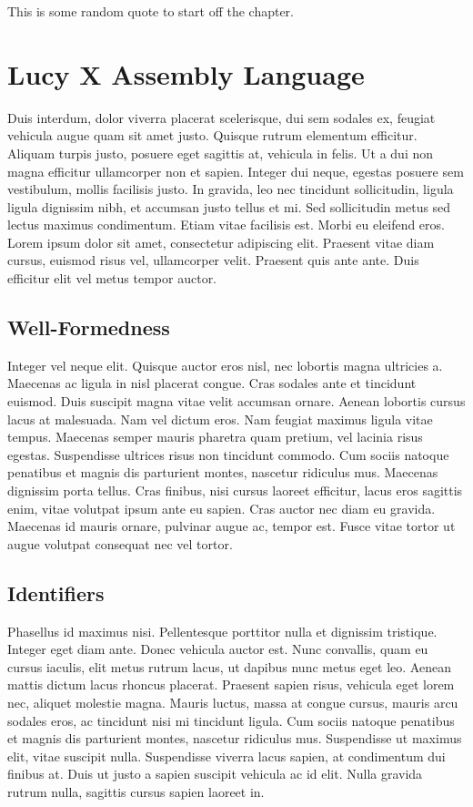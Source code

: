 \begin{savequote}[75mm]
This is some random quote to start off the chapter.
\end{savequote}

\chapter{Lucy X Assembly Language}
Duis interdum, dolor viverra placerat scelerisque, dui sem sodales ex, feugiat vehicula augue quam sit amet justo. Quisque rutrum elementum efficitur. Aliquam turpis justo, posuere eget sagittis at, vehicula in felis. Ut a dui non magna efficitur ullamcorper non et sapien. Integer dui neque, egestas posuere sem vestibulum, mollis facilisis justo. In gravida, leo nec tincidunt sollicitudin, ligula ligula dignissim nibh, et accumsan justo tellus et mi. Sed sollicitudin metus sed lectus maximus condimentum. Etiam vitae facilisis est. Morbi eu eleifend eros. Lorem ipsum dolor sit amet, consectetur adipiscing elit. Praesent vitae diam cursus, euismod risus vel, ullamcorper velit. Praesent quis ante ante. Duis efficitur elit vel metus tempor auctor.


\section{Well-Formedness}
Integer vel neque elit. Quisque auctor eros nisl, nec lobortis magna ultricies a. Maecenas ac ligula in nisl placerat congue. Cras sodales ante et tincidunt euismod. Duis suscipit magna vitae velit accumsan ornare. Aenean lobortis cursus lacus at malesuada. Nam vel dictum eros. Nam feugiat maximus ligula vitae tempus. Maecenas semper mauris pharetra quam pretium, vel lacinia risus egestas. Suspendisse ultrices risus non tincidunt commodo. Cum sociis natoque penatibus et magnis dis parturient montes, nascetur ridiculus mus. Maecenas dignissim porta tellus. Cras finibus, nisi cursus laoreet efficitur, lacus eros sagittis enim, vitae volutpat ipsum ante eu sapien. Cras auctor nec diam eu gravida. Maecenas id mauris ornare, pulvinar augue ac, tempor est. Fusce vitae tortor ut augue volutpat consequat nec vel tortor.


\section{Identifiers}
Phasellus id maximus nisi. Pellentesque porttitor nulla et dignissim tristique. Integer eget diam ante. Donec vehicula auctor est. Nunc convallis, quam eu cursus iaculis, elit metus rutrum lacus, ut dapibus nunc metus eget leo. Aenean mattis dictum lacus rhoncus placerat. Praesent sapien risus, vehicula eget lorem nec, aliquet molestie magna. Mauris luctus, massa at congue cursus, mauris arcu sodales eros, ac tincidunt nisi mi tincidunt ligula. Cum sociis natoque penatibus et magnis dis parturient montes, nascetur ridiculus mus. Suspendisse ut maximus elit, vitae suscipit nulla. Suspendisse viverra lacus sapien, at condimentum dui finibus at. Duis ut justo a sapien suscipit vehicula ac id elit. Nulla gravida rutrum nulla, sagittis cursus sapien laoreet in.


